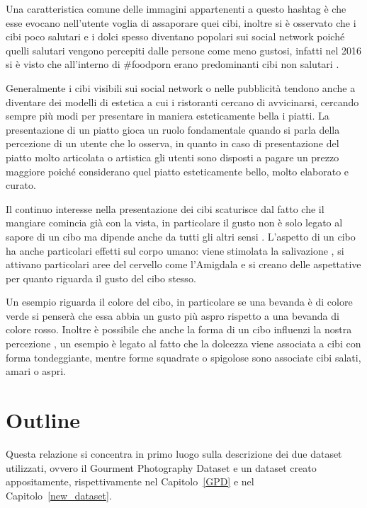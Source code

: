 Una caratteristica comune delle immagini appartenenti a questo hashtag è che esse evocano nell'utente voglia di assaporare quei cibi, inoltre si è osservato che i cibi poco salutari e i dolci spesso diventano popolari sui social network poiché quelli salutari vengono percepiti dalle persone come meno gustosi, infatti nel 2016 si è visto che all'interno di \#foodporn erano predominanti cibi non salutari \cite{peng2018feast}. 

Generalmente i cibi visibili sui social network o nelle pubblicità tendono anche a diventare dei modelli di estetica a cui i ristoranti cercano di avvicinarsi, cercando sempre più modi per presentare in maniera esteticamente bella i piatti. La presentazione di un piatto gioca un ruolo fondamentale quando si parla della percezione di un utente che lo osserva, in quanto in caso di presentazione del piatto molto articolata o artistica \cite{michel2014taste} gli utenti sono disposti a pagare un prezzo maggiore poiché considerano quel piatto esteticamente bello, molto elaborato e curato. 

Il continuo interesse nella presentazione dei cibi scaturisce dal fatto che il mangiare comincia già con la vista, in particolare il gusto non è solo legato al sapore di un cibo ma dipende anche da tutti gli altri sensi \cite{campo2017effects}. L'aspetto di un cibo ha anche particolari effetti sul corpo umano: viene stimolata la salivazione \cite{wooley1973salivation}, si attivano particolari aree del cervello come l'Amigdala \cite{labar2001hunger} e si creano delle aspettative per quanto riguarda il gusto del cibo stesso. 

Un esempio riguarda il colore \cite{spence2015psychological} del cibo, in particolare se una bevanda è di colore verde si penserà che essa abbia un gusto più aspro rispetto a una bevanda di colore rosso. Inoltre è possibile che anche la forma di un cibo influenzi la nostra percezione \cite{velasco2015hedonic}, un esempio è legato al fatto che la dolcezza viene associata a cibi con forma tondeggiante, mentre forme squadrate o spigolose sono associate cibi salati, amari o aspri.

\section{Outline}
Questa relazione si concentra in primo luogo sulla descrizione dei due dataset utilizzati, ovvero il Gourment Photography Dataset e un dataset creato appositamente, rispettivamente nel Capitolo~\ref{GPD} e nel Capitolo~\ref{new_dataset}. 

